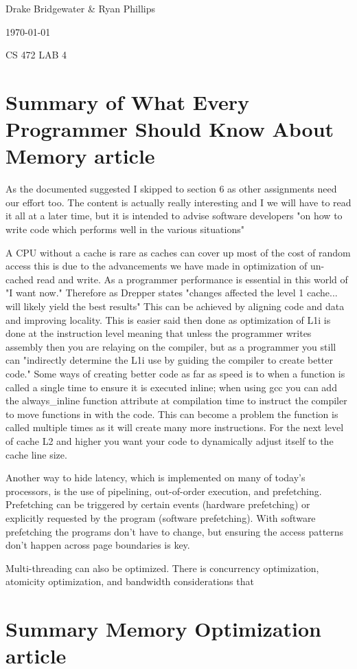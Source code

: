 \documentclass[letterpaper,12pt,titlepage]{article}
\def\name{Drake Bridgewater \& Ryan Phillips}
\begin{document}
\hfill \name

\hfill \today

\hfill CS 472 LAB 4

\section*{Summary of What Every Programmer Should Know About Memory article}
As the documented suggested I skipped to section 6 as other assignments need our effort too. The content is actually really interesting and I we will have to read it all at a later time, but it is intended to advise software developers "on how to write code which performs well in the various situations" \cite[p.~2]{Drepper} 

A CPU without a cache is rare as caches can cover up most of the cost of random access this is due to the advancements we have made in optimization of un-cached read and write. As a programmer performance is essential in this world of "I want now." Therefore as Drepper states "changes affected the level 1 cache... will likely yield the best results" \cite[p.~49]{Drepper} This can be achieved by aligning code and data and improving locality. This is easier said then done as optimization of L1i is done at the instruction level meaning that unless the programmer writes assembly then you are relaying on the compiler, but as a programmer you still can "indirectly determine the L1i use by guiding the compiler to create better code." \cite[p.~55]{Drepper} Some ways of creating better code as far as speed is to when a function is called a single time to ensure it is executed inline; when using gcc you can add the always\_inline function attribute at compilation time to instruct the compiler to move functions in with the code. This can become a problem the function is called multiple times as it will create many more instructions. For the next level of cache L2 and higher you want your code to dynamically adjust itself to the cache line size. 

Another way to hide latency, which is implemented on many of today's processors, is the use of pipelining, out-of-order execution, and prefetching. Prefetching can be triggered by certain
events (hardware prefetching) or explicitly requested by the program (software prefetching). \cite[p.~61]{Drepper} With software prefetching the programs don't have to change, but ensuring the access patterns don't happen across page boundaries is key. 

Multi-threading can also be optimized. There is concurrency optimization, atomicity optimization, and bandwidth considerations that 

\section*{Summary Memory Optimization article}



\end{document}
